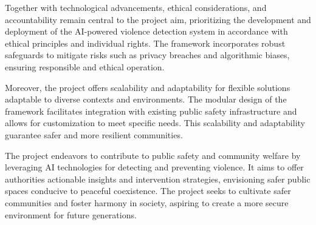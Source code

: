 \noindent Together with technological advancements, ethical considerations, and accountability remain central to the project aim, prioritizing the development and deployment of the AI-powered violence detection system in accordance with ethical principles and individual rights\cite{ai_ethics}. The framework incorporates robust safeguards to mitigate risks such as privacy breaches and algorithmic biases, ensuring responsible and ethical operation.

\noindent Moreover, the project offers scalability and adaptability for flexible solutions adaptable to diverse contexts and environments. The modular design of the framework facilitates integration with existing public safety infrastructure and allows for customization to meet specific needs. This scalability and adaptability guarantee safer and more resilient communities.

\noindent The project endeavors to contribute to public safety and community welfare by leveraging AI technologies for detecting and preventing violence. It aims to offer authorities actionable insights and intervention strategies, envisioning safer public spaces conducive to peaceful coexistence\cite{public_sector_ai}. The project seeks to cultivate safer communities and foster harmony in society, aspiring to create a more secure environment for future generations.

\renewcommand{\footrulewidth}{0.4pt}